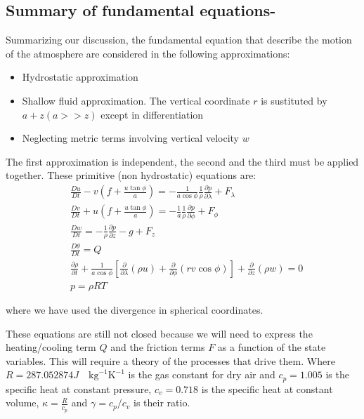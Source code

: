 \subsection{Summary of fundamental
equations-}\label{summary-of-fundamental-equations}

Summarizing our discussion, the fundamental equation that describe the
motion of the atmosphere are considered in the following approximations:
\begin{itemize}
    \item Hydrostatic approximation
    \item Shallow fluid approximation. The vertical coordinate $r$ is sustituted by $a+z(a>>z)$ except in differentiation
    \item Neglecting metric terms involving vertical velocity $w$
\end{itemize}
The first approximation is independent, the second and the third must be applied together. These primitive (non hydrostatic) equations are:
\[\begin{aligned}
      &\frac{D u}{Dt} - v\left(f +  \frac{u \tan{\phi}}{a}\right)  = -\frac{1}{ a \cos{\phi}}\frac{1}{\rho}\frac{\partial p}{\partial \lambda}   + F_\lambda \\
      &\frac{D v}{Dt} + u\left( f + \frac{u \tan{\phi}}{a}\right)  = -\frac{1}{a}\frac{1}{\rho}\frac{\partial p}{\partial \phi}  + F_\phi \\
      &\frac{D w}{Dt}  = -\frac{1}{\rho }\frac{\partial p}{\partial z} -g  + F_z \label{Eq:PrimEq}\\
      &\frac{D \theta}{Dt} = Q \\
      &\frac{\partial \rho}{\partial t}+\frac{1}{a\cos{\phi}}\left[ \frac{\partial }{\partial \lambda}(\rho u) + \frac{\partial }{\partial \phi}(rv\cos{\phi} )\right] +\frac{\partial }{\partial z}(\rho w) = 0 \\
      &p = \rho R T
\end{aligned}\]

where we have used the divergence in spherical coordinates.

These equations are still not closed because we will need to express the heating/cooling term \(Q\) and the friction terms \(F\) as a function of the state variables. This will require a theory of the processes that drive them. Where \(R=287.052874 J \quad \text{kg}^{-1} \text{K}^{-1}\) is the gas constant for dry air and \(c_p = 1.005\) is the specific heat at constant pressure, \(c_v = 0.718\) is the specific heat at constant volume, \(\kappa = \frac{R}{c_p}\) and \(\gamma=c_p/c_v\) is their ratio.

